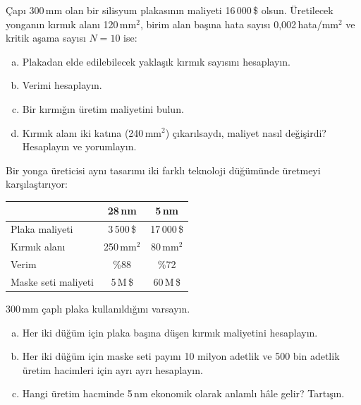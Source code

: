 \begin{alistirma}[\zor]
Çapı 300\,mm olan bir silisyum plakasının maliyeti 16\,000\,\$ olsun. Üretilecek yonganın kırmık alanı 120\,mm$^2$, birim alan başına hata sayısı 0{,}002\,hata/mm$^2$ ve kritik aşama sayısı $N = 10$ ise:
\begin{enumerate}[(a)]
    \item Plakadan elde edilebilecek yaklaşık kırmık sayısını hesaplayın.
    \item Verimi hesaplayın.
    \item Bir kırmığın üretim maliyetini bulun.
    \item Kırmık alanı iki katına (240\,mm$^2$) çıkarılsaydı, maliyet nasıl değişirdi? Hesaplayın ve yorumlayın.
\end{enumerate}
\end{alistirma}

\begin{alistirma}[\zor]
Bir yonga üreticisi aynı tasarımı iki farklı teknoloji düğümünde üretmeyi karşılaştırıyor:

\smallskip
\begin{tabular}{@{}lcc@{}}
\toprule
 & \textbf{28\,nm} & \textbf{5\,nm} \\
\midrule
Plaka maliyeti & 3\,500\,\$ & 17\,000\,\$ \\
Kırmık alanı & 250\,mm$^2$ & 80\,mm$^2$ \\
Verim & \%88 & \%72 \\
Maske seti maliyeti & 5\,M\,\$ & 60\,M\,\$ \\
\bottomrule
\end{tabular}
\smallskip

300\,mm çaplı plaka kullanıldığını varsayın.
\begin{enumerate}[(a)]
    \item Her iki düğüm için plaka başına düşen kırmık maliyetini hesaplayın.
    \item Her iki düğüm için maske seti payını 10 milyon adetlik ve 500 bin adetlik üretim hacimleri için ayrı ayrı hesaplayın.
    \item Hangi üretim hacminde 5\,nm ekonomik olarak anlamlı hâle gelir? Tartışın.
\end{enumerate}
\end{alistirma}

